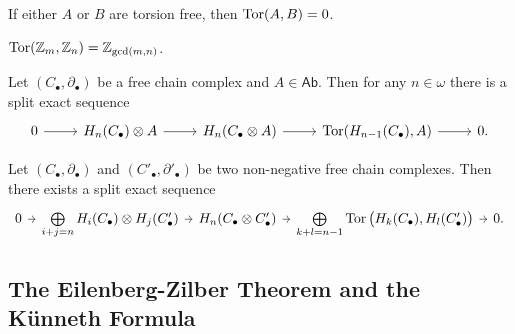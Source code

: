 \begin{example}
	If either $A$ or $B$ are torsion free, then $\operatorname{Tor}(A,B) = 0$.
\end{example}

\begin{example}
	$\operatorname{Tor}(\mathbb{Z}_m,\mathbb{Z}_n) = \mathbb{Z}_{\gcd(m,n)}$.
\end{example}

\begin{theorem}
	\label{thm:UCT}
	Let $(C_\bullet,\partial_\bullet)$ be a free chain complex and $A \in \mathsf{Ab}$. Then for any $n \in \omega$ there is a split exact sequence
	\begin{equation*}
		\begin{tikzcd}
			0 \arrow[r] & H_n(C_\bullet) \otimes A \arrow[r] & H_n(C_\bullet \otimes A) \arrow[r] & \Tor(H_{n - 1}(C_\bullet),A) \arrow[r] & 0.
		\end{tikzcd}
	\end{equation*}
\end{theorem}

\begin{theorem}
	\label{thm:Kunneth_theorem}
	Let $(C_\bullet,\partial_\bullet)$ and $(C'_\bullet,\partial'_\bullet)$ be two non-negative free chain complexes. Then there exists a split exact sequence
	\begin{equation*}
		\begin{tikzcd}[column sep=tiny]
			0 \arrow[r] & \bigoplus\limits_{i + j = n} H_i(C_\bullet) \otimes H_j(C'_\bullet) \arrow[r] & H_n(C_\bullet \otimes C'_\bullet) \arrow[r] & \bigoplus\limits_{k + l = n - 1} \Tor\del[1]{H_k(C_\bullet),H_l(C'_\bullet)} \arrow[r] & 0.
		\end{tikzcd}
	\end{equation*}
\end{theorem}

\subsection*{The Eilenberg-Zilber Theorem and the K\"unneth Formula}

